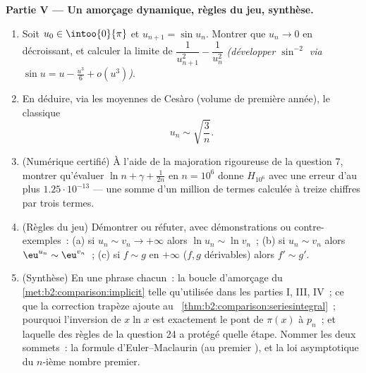 \begin{problem}
\medskip
\noindent\textbf{Partie V --- Un amorçage dynamique, règles du
jeu, synthèse.}
\begin{enumerate}[resume]
  \item Soit $u_0 \in \intoo{0}{\pi}$ et $u_{n+1} = \sin u_n$.
        Montrer que $u_n \to 0$ en décroissant, et calculer la limite
        de $\dfrac{1}{u_{n+1}^2} - \dfrac{1}{u_n^2}$ \emph{(développer
        $\sin^{-2}$ via $\sin u = u - \frac{u^3}6 + o(u^3)$)}.
  \item En déduire, via les moyennes de Cesàro (volume de première
        année), le classique
        \[
        u_n \sim \sqrt{\frac{3}{n}} .
        \]
  \item (Numérique certifié) À l'aide de la majoration rigoureuse de
        la question 7, montrer qu'évaluer $\ln n + \gamma + \frac1{2n}$
        en $n = 10^6$ donne $H_{10^6}$ avec une erreur d'au plus
        $1.25\cdot10^{-13}$ --- une somme d'un million de termes
        calculée à treize chiffres par trois termes.
  \item (Règles du jeu) Démontrer ou réfuter, avec démonstrations ou
        contre-exemples~: (a) si $u_n \sim v_n \to +\infty$ alors
        $\ln u_n \sim \ln v_n$~; (b) si $u_n \sim v_n$ alors
        $\eu^{u_n} \sim \eu^{v_n}$~; (c) si $f \sim g$ en
        $+\infty$ ($f, g$ dérivables) alors $f' \sim g'$.
  \item (Synthèse) En une phrase chacun~: la boucle d'amorçage du~%
        \cref{met:b2:comparison:implicit} telle qu'utilisée dans les
        parties I, III, IV~; ce que la correction trapèze ajoute au~%
        \cref{thm:b2:comparison:seriesintegral}~; pourquoi l'inversion
        de $x\ln x$ est exactement le pont de $\pi(x)$ à
        $p_n$~; et laquelle des règles de la question 24 a protégé
        quelle étape. Nommer les deux sommets~: la formule
        d'Euler--Maclaurin (au premier ), et la loi asymptotique
        du $n$-ième nombre premier.
\end{enumerate}
\end{problem}

